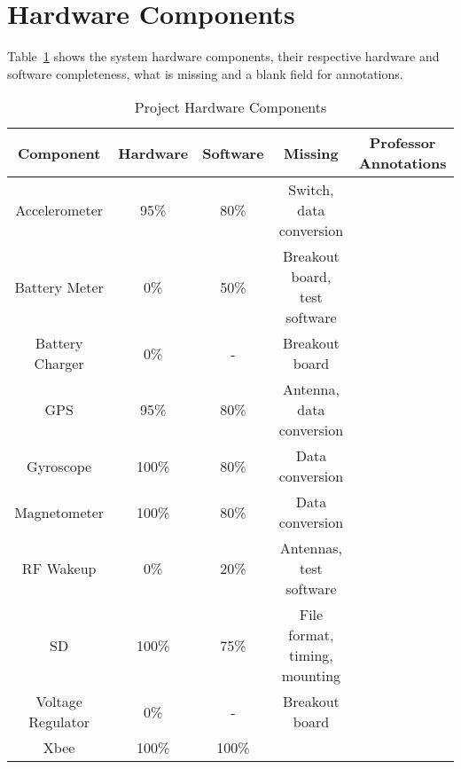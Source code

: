 \section{Hardware Components}
Table~\ref{tab:hwComp} shows the system hardware components, their respective hardware and software completeness, what is missing and a blank field for annotations.


    \begin{table}[H]
    \centering
    \caption{Project Hardware Components}
    \begin{tabular}{|c|c|c|c|c|}
    \hline
    \rowcolor{Gray}
    Component & Hardware & Software & Missing & Professor Annotations \\ 
    \hline \hline   
        Accelerometer & 95\% & 80\% & Switch, data conversion  & \\ \hline
        Battery Meter & 0\% & 50\%  & Breakout board, test software & \\ \hline
        Battery Charger & 0\% & -  & Breakout board & \\ \hline
        GPS   & 95\% & 80\%   & Antenna, data conversion & \\ \hline
        Gyroscope & 100\%   & 80\% & Data conversion & \\ \hline
        Magnetometer & 100\%   & 80\%  & Data conversion & \\ \hline
        RF Wakeup & 0\% & 20\%  & Antennas, test software & \\ \hline
        SD & 100\%  & 75\% & File format, timing, mounting& \\ \hline
        Voltage Regulator & 0\% & - & Breakout board & \\ \hline
        Xbee  & 100\% & 100\%  & & \\ \hline
        \end{tabular}%
    \label{tab:hwComp}%
    \end{table}